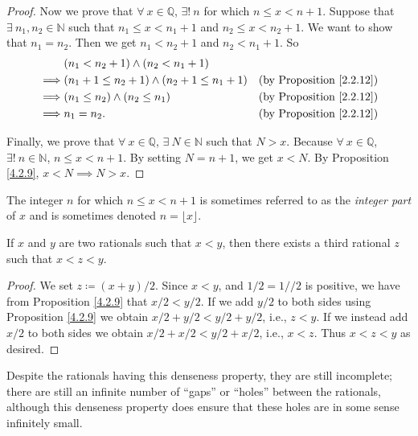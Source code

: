 \begin{proof}
Now we prove that \(\forall\ x \in \mathds{Q}\), \(\exists!\ n\) for which \(n \leq x < n + 1\).
Suppose that \(\exists\ n_1, n_2 \in \mathds{N}\) such that \(n_1 \leq x < n_1 + 1\) and \(n_2 \leq x < n_2 + 1\).
We want to show that \(n_1 = n_2\).
Then we get \(n_1 < n_2 + 1\) and \(n_2 < n_1 + 1\).
So
\begin{align*}
& (n_1 < n_2 + 1) \land (n_2 < n_1 + 1) \\
\implies & (n_1 + 1 \leq n_2 + 1) \land (n_2 + 1 \leq n_1 + 1) & \text{(by Proposition \ref{2.2.12})} \\
\implies & (n_1 \leq n_2) \land (n_2 \leq n_1) & \text{(by Proposition \ref{2.2.12})} \\
\implies & n_1 = n_2. & \text{(by Proposition \ref{2.2.12})}
\end{align*}

Finally, we prove that \(\forall\ x \in \mathds{Q}\), \(\exists\ N \in \mathds{N}\) such that \(N > x\).
Because \(\forall\ x \in \mathds{Q}\), \(\exists!\ n \in \mathds{N}\), \(n \leq x < n + 1\).
By setting \(N = n + 1\), we get \(x < N\).
By Proposition \ref{4.2.9}, \(x < N \implies N > x\).
\end{proof}

\begin{remark}\label{4.4.2}
The integer \(n\) for which \(n \leq x < n + 1\) is sometimes referred to as the \emph{integer part} of \(x\) and is sometimes denoted \(n = \lfloor x \rfloor\).
\end{remark}

\begin{proposition}\label{4.4.3}
If \(x\) and \(y\) are two rationals such that \(x < y\), then there exists a third rational \(z\) such that \(x < z < y\).
\end{proposition}

\begin{proof}
We set \(z \coloneqq (x + y) / 2\).
Since \(x < y\), and \(1 / 2 = 1 // 2\) is positive, we have from Proposition \ref{4.2.9} that \(x / 2 < y / 2\).
If we add \(y / 2\) to both sides using Proposition \ref{4.2.9} we obtain \(x / 2 + y / 2 < y / 2 + y / 2\), i.e., \(z < y\).
If we instead add \(x / 2\) to both sides we obtain \(x / 2 + x / 2 < y / 2 + x / 2\), i.e., \(x < z\).
Thus \(x < z < y\) as desired.
\end{proof}

\begin{note}
Despite the rationals having this denseness property, they are still incomplete;
there are still an infinite number of ``gaps'' or ``holes'' between the rationals, although this denseness property does ensure that these holes are in some sense infinitely small.
\end{note}

